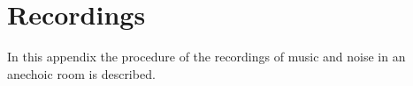 \chapter{Recordings} \label{recordings}
In this appendix the procedure of the recordings of music and noise in an anechoic room is described.

